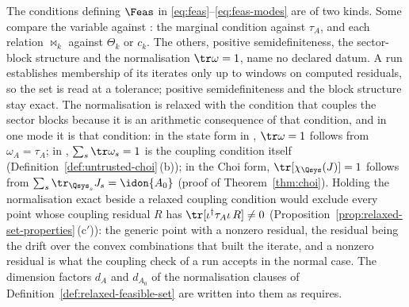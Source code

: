 
The conditions defining $\Feas$ in \eqref{eq:feas}--\eqref{eq:feas-modes}
are of two kinds. Some compare the variable against :
the marginal condition against $\tau_A$, and each relation $\bowtie_k$
against $\Theta_k$ or $c_k$. The others, positive semidefiniteness, the
sector-block structure and the normalisation $\tr\omega=1$, name no
declared datum. A run establishes membership of its iterates only up to
windows on computed residuals, so the set is read at a tolerance; positive
semidefiniteness and the block structure stay exact. The normalisation is
relaxed with the condition that couples the sector blocks because it is an
arithmetic consequence of that condition, and in one mode it is that
condition: in the state form in , $\tr\omega=1$
follows from $\omega_A=\tau_A$; in ,
$\sum_s\tr\omega_s=1$ is the coupling condition itself
(Definition~\ref{def:untrusted-choi}\,(b)); in the Choi form,
$\tr[\chi_{\Qsys}(J)]=1$ follows from
$\sum_s\tr_{\Qsys_s}J_s=\idon{A_0}$ (proof of Theorem~\ref{thm:choi}).
Holding the normalisation exact beside a relaxed coupling condition would
exclude every point whose coupling residual $R$ has
$\tr[\iota^{\dagger}\tau_A\iota\,R]\ne0$
(Proposition~\ref{prop:relaxed-set-properties}\,(c$'$)): the generic point
with a nonzero residual, the residual being the drift over the convex
combinations that built the iterate, and a nonzero residual is what the
coupling check of a run accepts in the normal case. The dimension factors
$d_A$ and $d_{A_0}$ of the normalisation clauses of
Definition~\ref{def:relaxed-feasible-set} are written into them as  requires.

